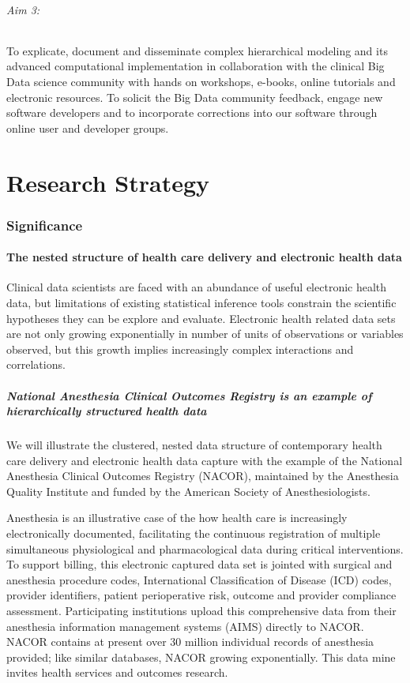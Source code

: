 \documentclass[11pt,notitlepage]{article}
\begin{document}
\paragraph*{Aim 3:} To explicate, document and disseminate complex hierarchical modeling and its advanced computational implementation in collaboration with the clinical Big Data science community with hands on workshops, e-books, online tutorials and electronic resources. To solicit the Big Data community feedback, engage new software developers and to incorporate corrections into our software through online user and developer groups.

\part*{Research Strategy}

\section*{Significance}

\subsection*{The nested structure of health care delivery and electronic health data}
Clinical data scientists are faced with an abundance of useful electronic health data, but limitations of existing statistical inference tools constrain the scientific hypotheses they can be explore and evaluate. Electronic health related data sets are not only growing exponentially in number of units of observations or variables observed, but this growth implies increasingly complex interactions and correlations. 

\subsubsection*{National Anesthesia Clinical Outcomes Registry is an example of hierarchically structured health data}
We will illustrate the clustered, nested data structure of contemporary health care delivery and electronic health data capture with the example of the National Anesthesia Clinical Outcomes Registry (NACOR), maintained by the Anesthesia Quality Institute and funded by the American Society of Anesthesiologists. 

Anesthesia is an illustrative case of the how health care is increasingly electronically documented, facilitating the continuous registration of multiple simultaneous physiological and pharmacological data during critical interventions. To support billing, this electronic captured data set is jointed with surgical and anesthesia procedure codes, International Classification of Disease (ICD) codes, provider identifiers, patient perioperative risk, outcome and provider compliance assessment. Participating institutions upload this comprehensive data from their anesthesia information management systems (AIMS) directly to NACOR. NACOR contains at present over 30 million individual records of anesthesia provided; like similar databases, NACOR growing exponentially. This data mine invites health services and outcomes research.
\end{document}
